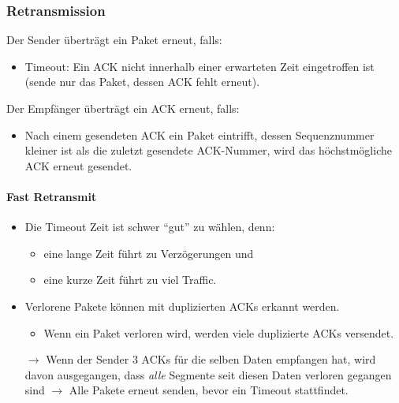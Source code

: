 			\subsubsection{Retransmission}
				Der Sender überträgt ein Paket erneut, falls:
				\begin{itemize}
					\item Timeout: Ein ACK nicht innerhalb einer erwarteten Zeit eingetroffen ist (sende nur das Paket, dessen ACK fehlt erneut).
				\end{itemize}
				Der Empfänger überträgt ein ACK erneut, falls:
				\begin{itemize}
					\item Nach einem gesendeten ACK ein Paket eintrifft, dessen Sequenznummer kleiner ist als die zuletzt gesendete ACK-Nummer, wird das höchstmögliche ACK erneut gesendet.
				\end{itemize}

				\paragraph{Fast Retransmit}
					\begin{itemize}
						\item Die Timeout Zeit ist schwer \enquote{gut} zu wählen, denn:
							\begin{itemize}
								\item eine lange Zeit führt zu Verzögerungen und
								\item eine kurze Zeit führt zu viel Traffic.
							\end{itemize}
						\item Verlorene Pakete können mit duplizierten ACKs erkannt werden.
							\begin{itemize}
								\item Wenn ein Paket verloren wird, werden viele duplizierte ACKs versendet.
							\end{itemize}
						\item[\(\rightarrow\)] Wenn der Sender 3 ACKs für die selben Daten empfangen hat, wird davon ausgegangen, dass \textit{alle} Segmente seit diesen Daten verloren gegangen sind \(\rightarrow\) Alle Pakete erneut senden, bevor ein Timeout stattfindet.
					\end{itemize}

